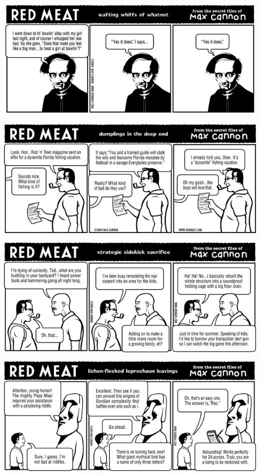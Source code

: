 \documentclass[a4paper,twoside,11pt]{article}
\begin{document}
\includegraphics[width=\textwidth]{redmeat_2004-03-16.png}



\includegraphics[width=\textwidth]{redmeat_2004-03-23.png}



\includegraphics[width=\textwidth]{redmeat_2004-03-30.png}



\includegraphics[width=\textwidth]{redmeat_2004-04-06.png}
\end{document}
